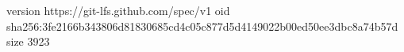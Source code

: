 version https://git-lfs.github.com/spec/v1
oid sha256:3fe2166b343806d81830685cd4c05c877d5d4149022b00ed50ee3dbc8a74b57d
size 3923
